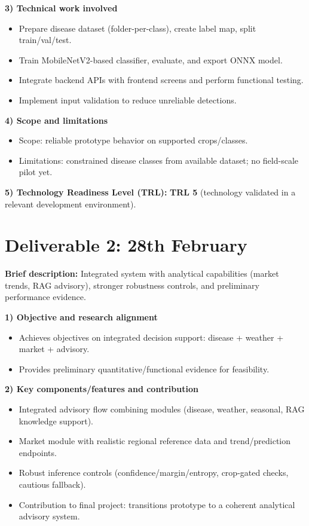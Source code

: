 \documentclass[10pt,a4paper]{article}
\begin{document}
\textbf{3) Technical work involved}
\begin{itemize}[noitemsep]
  \item Prepare disease dataset (folder-per-class), create label map, split train/val/test.
  \item Train MobileNetV2-based classifier, evaluate, and export ONNX model.
  \item Integrate backend APIs with frontend screens and perform functional testing.
  \item Implement input validation to reduce unreliable detections.
\end{itemize}

\textbf{4) Scope and limitations}
\begin{itemize}[noitemsep]
  \item Scope: reliable prototype behavior on supported crops/classes.
  \item Limitations: constrained disease classes from available dataset; no field-scale pilot yet.
\end{itemize}

\textbf{5) Technology Readiness Level (TRL):} \textbf{TRL 5} (technology validated in a relevant development environment).

\section*{Deliverable 2: 28th February}
\textbf{Brief description:} Integrated system with analytical capabilities (market trends, RAG advisory), stronger robustness controls, and preliminary performance evidence.

\textbf{1) Objective and research alignment}
\begin{itemize}[noitemsep]
  \item Achieves objectives on integrated decision support: disease + weather + market + advisory.
  \item Provides preliminary quantitative/functional evidence for feasibility.
\end{itemize}

\textbf{2) Key components/features and contribution}
\begin{itemize}[noitemsep]
  \item Integrated advisory flow combining modules (disease, weather, seasonal, RAG knowledge support).
  \item Market module with realistic regional reference data and trend/prediction endpoints.
  \item Robust inference controls (confidence/margin/entropy, crop-gated checks, cautious fallback).
  \item Contribution to final project: transitions prototype to a coherent analytical advisory system.
\end{itemize}
\end{document}
